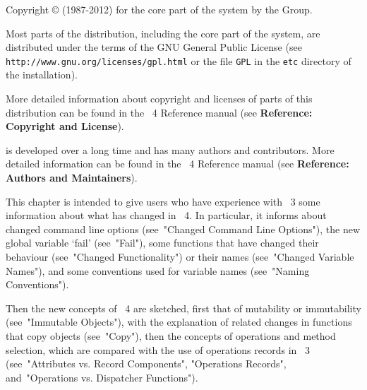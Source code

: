 
\TableOfContents
\FrontMatter
Copyright {\copyright} (1987-2012) for the core 
part of the {\GAP} system by the {\GAP} Group. 

Most parts of the {\GAP} distribution, including 
the core part of the {\GAP} system, are distributed 
under the terms of the GNU General Public License
(see {\tt{http://www.gnu.org/licenses/gpl.html}} 
or the file {\tt GPL} in the {\tt etc} directory 
of the {\GAP} installation). 

More detailed information about copyright and 
licenses of parts of this distribution can be 
found in the {\GAP}~4 Reference manual 
(see {\bf Reference: Copyright and License}). 

{\GAP} is developed over a long time and has 
many authors and contributors. More detailed 
information can be found in the {\GAP}~4 
Reference manual (see {\bf Reference: Authors and Maintainers}).  

\Chapters


This chapter is intended to give users who have experience with {\GAP}~3
some information about what has changed in {\GAP}~4.
In particular, it informs about changed command line options
(see~"Changed Command Line Options"),
the new global variable `fail' (see~"Fail"),
some functions that have changed their behaviour
(see~"Changed Functionality") or their names
(see~"Changed Variable Names"),
and some conventions used for variable names (see~"Naming Conventions").

Then the new concepts of {\GAP}~4 are sketched,
first that of mutability or immutability (see~"Immutable Objects"),
with the explanation of related changes in functions that copy objects
(see~"Copy"),
then the concepts of operations and method selection, which are compared
with the use of operations records in {\GAP}~3
(see~"Attributes vs. Record Components", "Operations Records",
and~"Operations vs. Dispatcher Functions").

